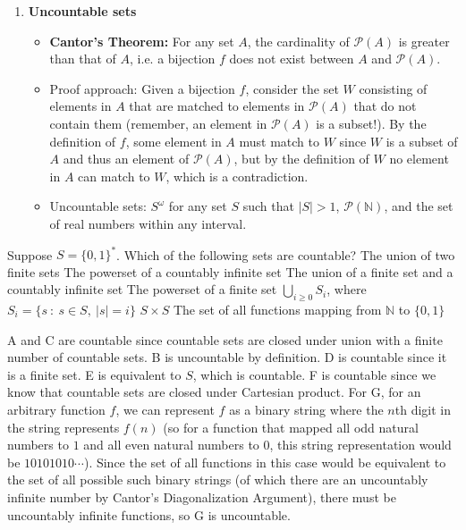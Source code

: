 \documentclass[solution, letterpaper]{cs20inclass}
\begin{document}
\begin{enumerate}
\item \textbf{Uncountable sets}
\begin{itemize}
\item {\bf Cantor's Theorem:} For any set $A$, the cardinality of $\mathcal{P}(A)$ is greater than that of $A$, i.e. a bijection $f$ does not exist between $A$ and $\mathcal{P}(A)$.
\item Proof approach: Given a bijection $f$, consider the set $W$ consisting of elements in $A$ that are matched to elements in $\mathcal{P}(A)$ that do not contain them (remember, an element in $\mathcal{P}(A)$ is a subset!). By the definition of $f$, some element in $A$ must match to $W$ since $W$ is a subset of $A$ and thus an element of $\mathcal{P}(A)$, but by the definition of $W$ no element in $A$ can match to $W$, which is a contradiction.
\item Uncountable sets: $S^\omega$ for any set $S$ such that $|S|>1$, $\mathcal{P}(\mathbb{N})$, and the set of real numbers within any interval.
\end{itemize}

\end{enumerate}
\pagebreak

\problem Suppose $S=\{0,1\}^*$. Which of the following sets are countable?
\subproblem The union of two finite sets
\subproblem The powerset of a countably infinite set
\subproblem The union of a finite set and a countably infinite set
\subproblem The powerset of a finite set
\subproblem $\bigcup_{i\geq 0} S_i$, where $S_i=\{s\ : \ s \in S, \ |s|=i\}$
\subproblem $S \times S$
\subproblem The set of all functions mapping from $\mathbb{N}$ to $\{0, 1\}$


\begin{solution}
A and C are countable since countable sets are closed under union with a finite number of countable sets. B is uncountable by definition. D is countable since it is a finite set. E is equivalent to $S$, which is countable. F is countable since we know that countable sets are closed under Cartesian product. For G, for an arbitrary function $f$, we can represent $f$ as a binary string where the $n$th digit in the string represents $f(n)$ (so for a function that mapped all odd natural numbers to $1$ and all even natural numbers to $0$, this string representation would be $10101010\cdots$). Since the set of all functions in this case would be equivalent to the set of all possible such binary strings (of which there are an uncountably infinite number by Cantor's Diagonalization Argument), there must be uncountably infinite functions, so G is uncountable.
\end{solution}
\end{document}
